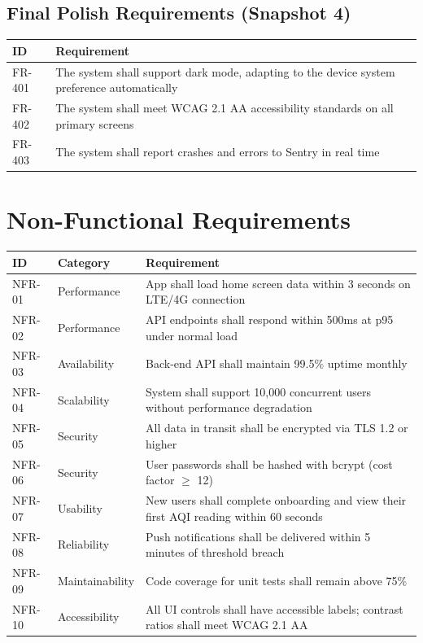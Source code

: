 \documentclass[12pt]{article}
\begin{document}
\subsection{Final Polish Requirements (Snapshot 4)}
\begin{tabularx}{\textwidth}{@{}L{2.2cm}Y@{}}
\toprule
\textbf{ID} & \textbf{Requirement} \\
\midrule
FR-401 & The system shall support dark mode, adapting to the device system preference automatically \\
FR-402 & The system shall meet WCAG 2.1 AA accessibility standards on all primary screens \\
FR-403 & The system shall report crashes and errors to Sentry in real time \\
\bottomrule
\end{tabularx}

\section{Non-Functional Requirements}

\begin{tabularx}{\textwidth}{@{}L{2cm}L{3cm}Y@{}}
\toprule
\textbf{ID} & \textbf{Category} & \textbf{Requirement} \\
\midrule
NFR-01 & Performance & App shall load home screen data within 3 seconds on LTE/4G connection \\
NFR-02 & Performance & API endpoints shall respond within 500ms at p95 under normal load \\
NFR-03 & Availability & Back-end API shall maintain 99.5\% uptime monthly \\
NFR-04 & Scalability & System shall support 10,000 concurrent users without performance degradation \\
NFR-05 & Security & All data in transit shall be encrypted via TLS 1.2 or higher \\
NFR-06 & Security & User passwords shall be hashed with bcrypt (cost factor $\geq$ 12) \\
NFR-07 & Usability & New users shall complete onboarding and view their first AQI reading within 60 seconds \\
NFR-08 & Reliability & Push notifications shall be delivered within 5 minutes of threshold breach \\
NFR-09 & Maintainability & Code coverage for unit tests shall remain above 75\% \\
NFR-10 & Accessibility & All UI controls shall have accessible labels; contrast ratios shall meet WCAG 2.1 AA \\
\bottomrule
\end{tabularx}
\end{document}
